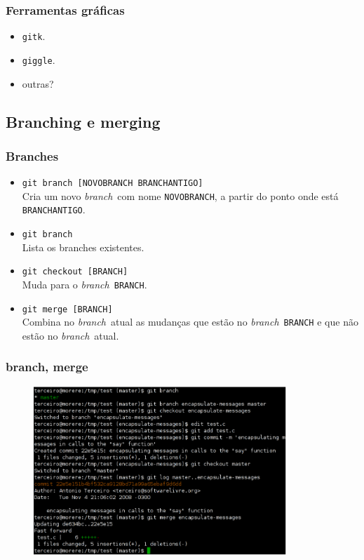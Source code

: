 \documentclass{beamer}
\newcommand{\branch}{\emph{branch}}
\begin{document}
\begin{frame}
  \frametitle{Ferramentas gráficas}
  \begin{itemize}
    \item \texttt{gitk}.
    \item \texttt{giggle}.
    \item outras?
  \end{itemize}
\end{frame}

\subsection{Branching e merging}

\begin{frame}
  \frametitle{Branches}
  \begin{itemize}
    \item \texttt{git branch [NOVOBRANCH BRANCHANTIGO]}\\
      Cria um novo \branch\ com nome \texttt{NOVOBRANCH}, a partir do
      ponto onde está \texttt{BRANCHANTIGO}.
      \pause

    \item \texttt{git branch}\\
      Lista os branches existentes.
      \pause

    \item \texttt{git checkout [BRANCH]}\\
      Muda para o \branch\ \texttt{BRANCH}.
      \pause

    \item \texttt{git merge [BRANCH]}\\
      Combina no \branch\ atual as mudanças que estão no \branch\ 
      \texttt{BRANCH} e que não estão no \branch\ atual.
  \end{itemize}
\end{frame}

\begin{frame}
  \frametitle{branch, merge}
  \begin{figure}[h]
    \begin{center}
      \includegraphics[width=0.85\textwidth]{figs/git-screenshot-branch-merge.pdf}
    \end{center}
    \label{fig:git-branch-merge-screenshot}
  \end{figure}
\end{frame}
\end{document}
